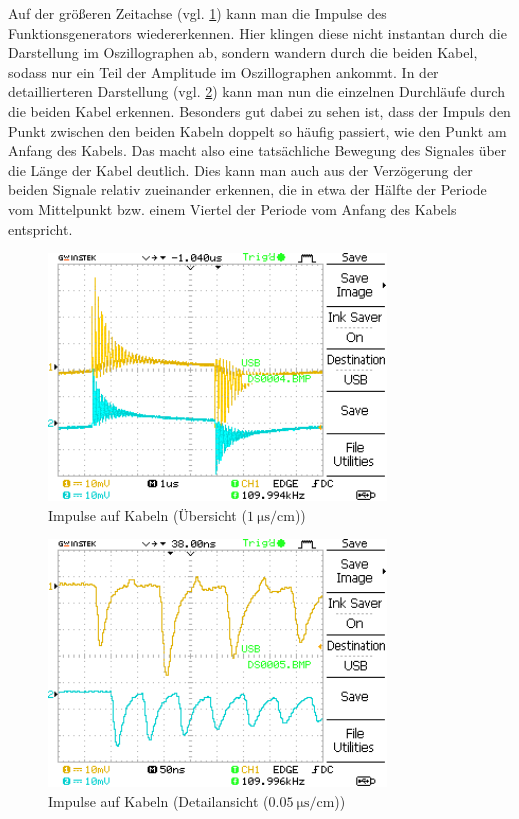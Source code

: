 \documentclass{article}
\begin{document}
			Auf der größeren Zeitachse (vgl. \ref{fig:DS0004}) kann man die Impulse des Funktionsgenerators wiedererkennen. Hier klingen diese nicht instantan durch die Darstellung im Oszillographen ab, sondern wandern durch die beiden Kabel, sodass nur ein Teil der Amplitude im Oszillographen ankommt. In der detaillierteren Darstellung (vgl. \ref{fig:DS0005}) kann man nun die einzelnen Durchläufe durch die beiden Kabel erkennen. Besonders gut dabei zu sehen ist, dass der Impuls den Punkt zwischen den beiden Kabeln doppelt so häufig passiert, wie den Punkt am Anfang des Kabels. Das macht also eine tatsächliche Bewegung des Signales über die Länge der Kabel deutlich. Dies kann man auch aus der Verzögerung der beiden Signale relativ zueinander erkennen, die in etwa der Hälfte der Periode vom Mittelpunkt bzw. einem Viertel der Periode vom Anfang des Kabels entspricht. 
			
			\begin{figure}[H]
				\centering
				\includegraphics[width=0.8\textwidth]{MesswerteVersuch1/DS0004.png}
				\caption{Impulse auf Kabeln (Übersicht ($\SI{1}{\micro\second\per\centi\meter}$))}
				\label{fig:DS0004}
			\end{figure}
			\begin{figure}[H]
				\centering
				\includegraphics[width=0.8\textwidth]{MesswerteVersuch1/DS0005.png}
				\caption{Impulse auf Kabeln (Detailansicht ($\SI{0.05}{\micro\second\per\centi\meter}$))}
				\label{fig:DS0005}
			\end{figure}
		
\end{document}
